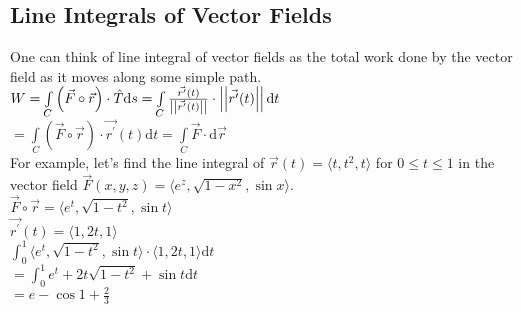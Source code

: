 \subsection{Line Integrals of Vector Fields}
\noindent
One can think of line integral of vector fields as the total work done by the vector field as it moves along some simple path.\\
\indent
$W=\int\limits_{C}{\left(\vec{F}\circ\vec{r}\right)\cdot\hat{T}\mathrm{d}s}=\int\limits_{C}{\frac{\vec{r^\prime}(t)}{\left|\left|\vec{r^\prime}(t)\right|\right|}\cdot\left|\left|\vec{r^\prime}(t)\right|\right|\mathrm{d}t}$\\
\indent
$=\int\limits_{C}{\left(\vec{F}\circ\vec{r}\right)\cdot\vec{r^\prime}(t)\mathrm{d}t}=\int\limits_{C}{\vec{F}\cdot\mathrm{d}\vec{r}}$\\

\noindent
For example, let's find the line integral of $\vec{r}(t)=\langle t,t^2,t\rangle$ for $0\leq t\leq 1$ in the vector field $\vec{F}(x,y,z)=\langle e^z,\sqrt{1-x^2},\sin{x}\rangle$.\\
\indent
$\vec{F}\circ\vec{r}=\langle e^t,\sqrt{1-t^2},\sin{t}\rangle$\\
\indent
$\vec{r^\prime}(t)=\langle 1,2t,1\rangle$\\
\indent
$\int_{0}^{1}{\langle e^t, \sqrt{1-t^2},\sin{t}\rangle\cdot\langle 1,2t,1\rangle\mathrm{d}t}$\\
\indent
$=\int_{0}^{1}{e^t+2t\sqrt{1-t^2}+\sin{t}\mathrm{d}t}$\\
\indent
$=e-\cos{1}+\frac{2}{3}$\\


